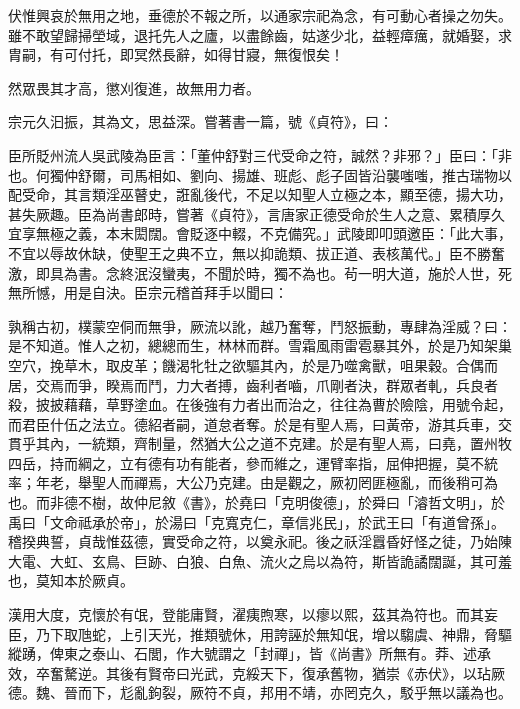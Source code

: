 \begin{pinyinscope}
 伏惟興哀於無用之地，垂德於不報之所，以通家宗祀為念，有可動心者操之勿失。雖不敢望歸掃塋域，退托先人之廬，以盡餘齒，姑遂少北，益輕瘴癘，就婚娶，求胄嗣，有可付托，即冥然長辭，如得甘寢，無復恨矣！



 然眾畏其才高，懲刈復進，故無用力者。



 宗元久汩振，其為文，思益深。嘗著書一篇，號《貞符》，曰：



 臣所貶州流人吳武陵為臣言：「董仲舒對三代受命之符，誠然？非邪？」臣曰：「非也。何獨仲舒爾，司馬相如、劉向、揚雄、班彪、彪子固皆沿襲嗤嗤，推古瑞物以配受命，其言類淫巫瞽史，誑亂後代，不足以知聖人立極之本，顯至德，揚大功，甚失厥趣。臣為尚書郎時，嘗著《貞符》，言唐家正德受命於生人之意、累積厚久宜享無極之義，本末閎闊。會貶逐中輟，不克備究。」武陵即叩頭邀臣：「此大事，不宜以辱故休缺，使聖王之典不立，無以抑詭類、拔正道、表核萬代。」臣不勝奮激，即具為書。念終泯沒蠻夷，不聞於時，獨不為也。茍一明大道，施於人世，死無所憾，用是自決。臣宗元稽首拜手以聞曰：



 孰稱古初，樸蒙空侗而無爭，厥流以訛，越乃奮奪，鬥怒振動，專肆為淫威？曰：是不知道。惟人之初，總總而生，林林而群。雪霜風雨雷雹暴其外，於是乃知架巢空穴，挽草木，取皮革；饑渴牝牡之欲驅其內，於是乃噬禽獸，咀果穀。合偶而居，交焉而爭，睽焉而鬥，力大者搏，齒利者嚙，爪剛者決，群眾者軋，兵良者殺，披披藉藉，草野塗血。在後強有力者出而治之，往往為曹於險陰，用號令起，而君臣什伍之法立。德紹者嗣，道怠者奪。於是有聖人焉，曰黃帝，游其兵車，交貫乎其內，一統類，齊制量，然猶大公之道不克建。於是有聖人焉，曰堯，置州牧四岳，持而綱之，立有德有功有能者，參而維之，運臂率指，屈伸把握，莫不統率；年老，舉聖人而禪焉，大公乃克建。由是觀之，厥初罔匪極亂，而後稍可為也。而非德不樹，故仲尼敘《書》，於堯曰「克明俊德」，於舜曰「濬哲文明」，於禹曰「文命祗承於帝」，於湯曰「克寬克仁，章信兆民」，於武王曰「有道曾孫」。稽揆典誓，貞哉惟茲德，實受命之符，以奠永祀。後之祅淫囂昏好怪之徒，乃始陳大電、大虹、玄鳥、巨跡、白狼、白魚、流火之烏以為符，斯皆詭譎闊誕，其可羞也，莫知本於厥貞。



 漢用大度，克懷於有氓，登能庸賢，濯痍煦寒，以瘳以熙，茲其為符也。而其妄臣，乃下取虺蛇，上引天光，推類號休，用誇誣於無知氓，增以騶虞、神鼎，脅驅縱踴，俾東之泰山、石閭，作大號謂之「封禪」，皆《尚書》所無有。莽、述承效，卒奮驁逆。其後有賢帝曰光武，克綏天下，復承舊物，猶崇《赤伏》，以玷厥德。魏、晉而下，尨亂鉤裂，厥符不貞，邦用不靖，亦罔克久，駁乎無以議為也。




\end{pinyinscope}
